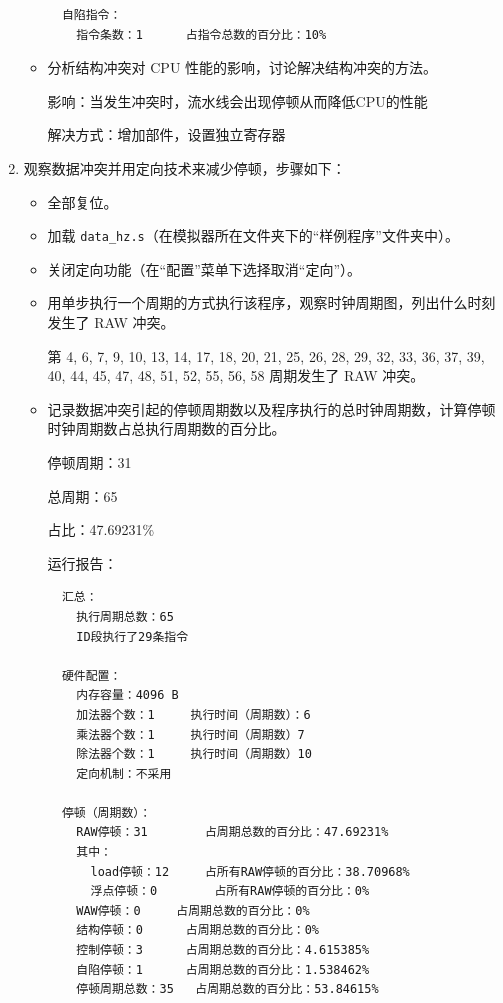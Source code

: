 \documentclass[blue,normal,cn]{elegantnote}
\newcommand{\code}[1]{\colorbox{light-gray}{\texttt{#1}}}
\begin{document}
\begin{enumerate}[wide=0pt, listparindent=2em, parsep=0pt]
\begin{itemize}[leftmargin=3em, listparindent=2em, parsep=0pt]
\begin{lstlisting}
  自陷指令：
    指令条数：1		占指令总数的百分比：10%
\end{lstlisting}
              \item 分析结构冲突对 CPU 性能的影响，讨论解决结构冲突的方法。

                    \textcolor{ans}{影响：当发生冲突时，流水线会出现停顿从而降低CPU的性能}

                    \textcolor{ans}{解决方式：增加部件，设置独立寄存器}
          \end{itemize}

    \item 观察数据冲突并用定向技术来减少停顿，步骤如下：
          \begin{itemize}[leftmargin=3em, listparindent=2em, parsep=0pt]
              \item 全部复位。
              \item 加载 \code{data\_hz.s}（在模拟器所在文件夹下的“样例程序”文件夹中）。
              \item 关闭定向功能（在“配置”菜单下选择取消“定向”）。
              \item 用单步执行一个周期的方式执行该程序，观察时钟周期图，列出什么时刻发生了 RAW 冲突。

                    \textcolor{ans}{第 4, 6, 7, 9, 10, 13, 14, 17, 18, 20, 21, 25, 26, 28, 29, 32, 33, 36, 37, 39, 40, 44, 45, 47, 48, 51, 52, 55, 56, 58 周期发生了 RAW 冲突。}

              \item 记录数据冲突引起的停顿周期数以及程序执行的总时钟周期数，计算停顿时钟周期数占总执行周期数的百分比。

                    \textcolor{ans} {停顿周期：31}

                    \textcolor{ans} {总周期：65}

                    \textcolor{ans} {占比：47.69231\%}

                    \textcolor{ans}{运行报告：}
                    \begin{lstlisting}
  汇总：
    执行周期总数：65
    ID段执行了29条指令

  硬件配置：
    内存容量：4096 B
    加法器个数：1		执行时间（周期数）：6
    乘法器个数：1		执行时间（周期数）7		
    除法器个数：1		执行时间（周期数）10		
    定向机制：不采用

  停顿（周期数）：
    RAW停顿：31		占周期总数的百分比：47.69231%
    其中：
      load停顿：12		占所有RAW停顿的百分比：38.70968%
      浮点停顿：0		占所有RAW停顿的百分比：0%
    WAW停顿：0		占周期总数的百分比：0%
    结构停顿：0		占周期总数的百分比：0%
    控制停顿：3		占周期总数的百分比：4.615385%
    自陷停顿：1		占周期总数的百分比：1.538462%
    停顿周期总数：35	占周期总数的百分比：53.84615%


\end{lstlisting}
\end{itemize}
\end{enumerate}
\end{document}
